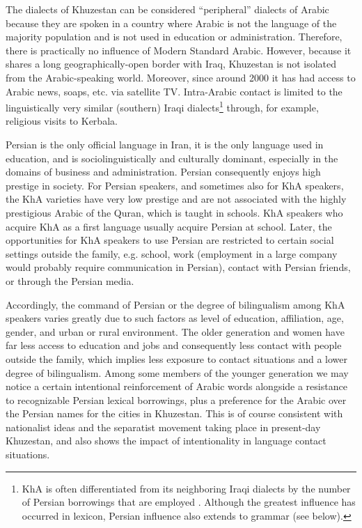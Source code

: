 \documentclass[output=paper,nonflat]{langsci/langscibook}
\begin{document}
The dialects of Khuzestan can be considered “peripheral” dialects of Arabic because they are spoken in a country where Arabic is not the language of the majority population and is not used in education or administration. Therefore, there is practically no influence of Modern Standard Arabic. However, because it shares a long geographically-open border with Iraq, Khuzestan is not isolated from the Arabic-speaking world. Moreover, since around 2000 it has had access to Arabic news, soaps, etc. via satellite TV. Intra-Arabic contact is limited to the linguistically very similar (southern) Iraqi dialects\footnote{KhA is often differentiated from its neighboring Iraqi dialects by the number of Persian borrowings that are employed \citep[1020]{Gazsi2011}. Although the greatest influence has occurred in lexicon, Persian influence also extends to grammar (see below).} through, for example, religious visits to Kerbala.

Persian is the only official language in Iran, it is the only language used in education, and is sociolinguistically and culturally dominant, especially in the domains of business and administration. Persian consequently enjoys high prestige in society. For Persian speakers, and sometimes also for KhA speakers, the KhA varieties have very low prestige and are not associated with the highly prestigious Arabic of the Quran, which is taught in schools. KhA speakers who acquire KhA as a first language usually acquire Persian at school. Later, the opportunities for KhA speakers to use Persian are restricted to certain social settings outside the family, e.g. school, work (employment in a large company would probably require communication in Persian), contact with Persian friends, or through the Persian media.

Accordingly, the command of Persian or the degree of bilingualism among KhA speakers varies greatly due to such factors as level of education, affiliation, age, gender, and urban or rural environment. The older generation and women have far less access to education and jobs and consequently less contact with people outside the family, which implies less exposure to contact situations and a lower degree of bilingualism. Among some members of the younger generation we may notice a certain intentional reinforcement of Arabic words alongside a resistance to recognizable Persian lexical borrowings, plus a preference for the Arabic over the Persian names for the cities in Khuzestan. This is of course consistent with nationalist ideas and the separatist movement taking place in present-day Khuzestan, and also shows the impact of intentionality in language contact situations. 
\end{document}
